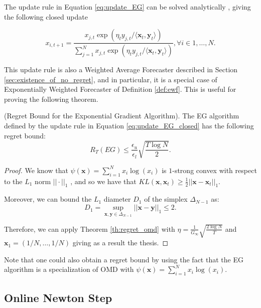 The update rule in Equation \eqref{eq:update_EG} can be solved analytically \cite{helmbold1998line}, giving the following closed update 

\begin{equation}\label{eq:update_EG_closed}
x_{i,t+1}=\frac{x_{j,t}\exp\left(\eta_t{y_{j,t}}/\langle\mathbf x_t,\mathbf y_t\rangle\right)}{\sum\limits_{j=1}^Nx_{j,t}\exp\left(\eta_t{y_{j,t}}/\langle\mathbf x_t,\mathbf y_t\rangle\right)}, \forall i\in1,\ldots,N.
\end{equation}

This update rule is also a Weighted Average Forecaster described in Section \ref{sec:existence_of_no_regret}, and in particular, it is a special case of Exponentially Weighted Forecaster of Definition \ref{def:ewf}. This is useful for proving the following theorem.

\begin{theorem}(Regret Bound for the Exponential Gradient Algorithm).
The EG algorithm defined by the update rule in Equation \eqref{eq:update_EG_closed} has the following regret bound:
\begin{equation}
R_T(EG)\le \frac{\epsilon_u}{\epsilon_l}\sqrt{\frac{T\log N}{2}}.
\end{equation}
\end{theorem}

\begin{proof}
We know that $\psi(\mathbf x)=\sum\limits_{i=1}^Nx_i\log(x_i)$ is $1$-strong convex with respect to the $L_1$ norm $||\cdot||_1$ \cite{shalev2007online}, and so we have that $KL(\mathbf x,\mathbf x_t)\ge\frac{1}{2}||\mathbf x-\mathbf x_t||_1$.

Moreover, we can bound the $L_1$ diameter $D_1$ of the simplex $\Delta_{N-1}$ as: 
$$D_1=\sup\limits_{\mathbf x,\mathbf y\in\Delta_{N-1}}||\mathbf x-\mathbf y||_1\le2.$$

Therefore, we can apply Theorem \ref{th:regret_omd} with $\eta=\frac{1}{G_\infty}\sqrt{\frac{2\log N}{T}}$ and $\mathbf x_1=(1/N,\ldots,1/N)$ giving as a result the thesis.
\end{proof}

Note that one could also obtain a regret bound by using the fact that the EG algorithm is a specialization of OMD with $\psi(\mathbf x)=\sum\limits_{i=1}^N x_i\log(x_i)$. 

\subsection{Online Newton Step}\label{sec:ONS}

